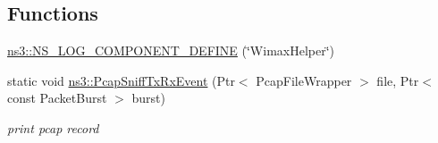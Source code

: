 \subsection*{Functions}
\begin{DoxyCompactItemize}
\item 
\hyperlink{namespacens3_a18164ffde633b9c2150a125a1eaa7b0b}{ns3\+::\+N\+S\+\_\+\+L\+O\+G\+\_\+\+C\+O\+M\+P\+O\+N\+E\+N\+T\+\_\+\+D\+E\+F\+I\+NE} (\char`\"{}Wimax\+Helper\char`\"{})
\item 
static void \hyperlink{namespacens3_a115574906966df73c11f9d03b10c71fd}{ns3\+::\+Pcap\+Sniff\+Tx\+Rx\+Event} (Ptr$<$ Pcap\+File\+Wrapper $>$ file, Ptr$<$ const Packet\+Burst $>$ burst)
\begin{DoxyCompactList}\small\item\em print pcap record \end{DoxyCompactList}\end{DoxyCompactItemize}
